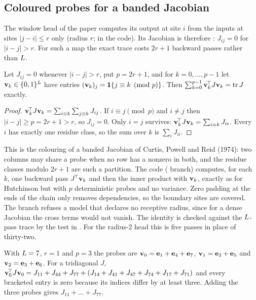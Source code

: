 \subsection{Coloured probes for a banded Jacobian}
\label{sec:sm:coloured}

The window head of the paper computes its output at site $i$ from the inputs at sites
$|j-i|\le r$ only (radius $r$;  in the code). Its Jacobian is
therefore : $J_{ij}=0$ for $|i-j|>r$. For such a map the exact trace
costs $2r+1$ backward passes rather than $L$.

\begin{proposition}
\label{prop:sm:coloured}
Let $J_{ij}=0$ whenever $|i-j|>r$, put $p=2r+1$, and for $k=0,\dots,p-1$ let
$\mathbf{v}_k\in\{0,1\}^{L}$ have entries $(\mathbf{v}_k)_j=\mathbf 1\{j\equiv k\pmod p\}$.
Then $\sum_{k=0}^{p-1}\mathbf{v}_k^{\!\top}J\mathbf{v}_k=\operatorname{tr} J$ exactly.
\end{proposition}

\begin{proof}
$\mathbf{v}_k^{\!\top}J\mathbf{v}_k=\sum_{i\equiv k}\sum_{j\equiv k}J_{ij}$. If $i\equiv j\pmod p$
and $i\ne j$ then $|i-j|\ge p=2r+1>r$, so $J_{ij}=0$. Only $i=j$ survives:
$\mathbf{v}_k^{\!\top}J\mathbf{v}_k=\sum_{i\equiv k}J_{ii}$. Every $i$ has exactly one
residue class, so the sum over $k$ is $\sum_iJ_{ii}$.
\end{proof}

This is the colouring of a banded Jacobian of Curtis, Powell and Reid (1974): two
columns may share a probe when no row has a nonzero in both, and the residue classes
modulo $2r+1$ are such a partition. The code ( branch) computes, for
each $k$, one backward pass $J^{\!\top}\mathbf{v}_k$ and then the inner product with
$\mathbf{v}_k$, exactly as for Hutchinson but with $p$ deterministic probes and no
variance. Zero padding at the ends of the chain only removes dependencies, so the
boundary sites are covered. The branch refuses a model that declares no receptive
radius, since for a dense Jacobian the cross terms would not vanish. The identity is
checked against the $L$-pass trace by the test
in . For the radius-2 head this is five passes in place
of thirty-two.

\begin{example}
\label{ex:sm:coloured}
With $L=7$, $r=1$ and $p=3$ the probes are $\mathbf{v}_0=\mathbf{e}_1+\mathbf{e}_4+\mathbf{e}_7$,
$\mathbf{v}_1=\mathbf{e}_2+\mathbf{e}_5$ and $\mathbf{v}_2=\mathbf{e}_3+\mathbf{e}_6$. For a
tridiagonal $J$,
$\mathbf{v}_0^{\!\top}J\mathbf{v}_0=J_{11}+J_{44}+J_{77}+(J_{14}+J_{41}+J_{47}+J_{74}+J_{17}+J_{71})$
and every bracketed entry is zero because its indices differ by at least three. Adding
the three probes gives $J_{11}+\dots+J_{77}$.
\end{example}

